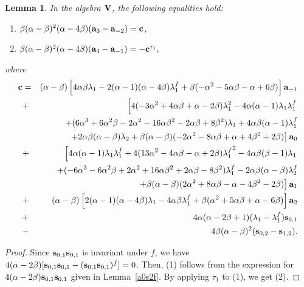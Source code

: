 \documentclass[a4paper]{amsart}
\newtheorem{lemma}{Lemma}[section]
\newcommand{\Vo}{{\bf V}}
\newcommand{\lmu}{\lambda_1}
\newcommand{\lmf}{\lambda_1^f}
\newcommand{\lmd}{\lambda_2}
\newcommand{\lmdf}{\lambda_2^f}
\newcommand{\al}{\alpha}
\newcommand{\bt}{\beta}
\newcommand{\ba}{{\bf a}}
\newcommand{\bc}{{\bf c}}
\newcommand{\bs}{{\bf s}}
\begin{document}
\begin{lemma}\label{a3} In the algebra $\Vo$, the following equalities hold:
\begin{enumerate} 
\item  $\beta(\alpha-\beta)^2(\alpha-4\beta)(\ba_3-\ba_{-2})=\bc$, 
\item  $\beta(\alpha-\beta)^2(\alpha-4\beta)(\ba_4-\ba_{-1})=-\bc^{\tau_1},$
\end{enumerate} where
\begin{eqnarray*}
\bc&=&
(\alpha-\beta)\left[ 4\alpha\beta\lmu-2(\alpha-1)(\alpha-4\beta)\lmf+\beta(-\alpha^2-5\alpha\beta-\alpha+6\beta)\right ]\ba_{-1}\\
&+& \left [4(-3\alpha^2+4\alpha\beta+\alpha-2\beta)\lmu^2-4\alpha(\alpha-1)\lmu\lmf \right .\\
&&
+(6\alpha^3+6\alpha^2\beta-2\alpha^2-16\alpha\beta^2-2\alpha\beta+8\beta^2)\lmu
+4\alpha\beta(\alpha-1)\lmf \\
&& \left . +2\alpha\beta(\alpha -\beta)
\lmd+\beta(\alpha-\beta)(-2\alpha^2-8\alpha\beta+\alpha+4\beta^2+2\beta)
\right ]  \ba_0\\
&+&\left [ 4\alpha(\alpha-1)\lmu\lmf+4(13\alpha^2-4\alpha\beta-\alpha+2\beta){\lmu^f}^2-4\alpha\beta(\beta-1)\lmu\right .\\
&&+(-6\alpha^3-6\alpha^2\beta+2\alpha^2+16\alpha\beta^2+2\alpha\beta-8\beta^2)\lmf-2\alpha\beta(\alpha-\beta)\lmdf\\
& & \left .+\beta(\alpha-\beta)(2\alpha^2+8\alpha\beta-\alpha-4\beta^2-2\beta)\right ]\ba_1\\
&+&(\alpha-\beta)\left [2(\alpha-1)(\alpha-4\beta)\lmu-4\alpha\beta\lmf+\beta(\alpha^2+5\alpha\beta+\alpha-6\beta)\right ]\ba_2\\
&+& 4\alpha(\alpha-2\beta+1)(\lmu-\lmf)\bs_{0,1}\\
&-& 4\beta (\alpha-\beta)^2(\bs_{0,2}-\bs_{1,2}). 
\end{eqnarray*}
\end{lemma}
\begin{proof}
Since $\bs_{0,1}\bs_{0,1}$ is invariant under $f$, we have $4(\al-2\bt)[\bs_{0,1}\bs_{0,1}- (\bs_{0,1}\bs_{0,1})^f]=0$. Then,  (1) follows from the expression for $4(\alpha-2\beta)\bs_{0,1} \bs_{0,1}$ given in Lemma~\ref{a0s2f}. By applying $\tau_1$ to (1), we get (2).
\end{proof}
\end{document}
